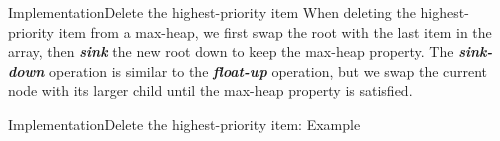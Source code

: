 \documentclass[aspectratio=169]{ctexbeamer}
\newcommand{\highlight}[1]{\textbf{\textit{#1}}}
\begin{document}
    \begin{frame}{Implementation}{Delete the highest-priority item}
        When deleting the highest-priority item from a max-heap, we first swap the root with the last item in the array, then \highlight{sink} the new root down to keep the max-heap property. The \highlight{sink-down} operation is similar to the \highlight{float-up} operation, but we swap the current node with its larger child until the max-heap property is satisfied.
    \end{frame}

    \begin{frame}{Implementation}{Delete the highest-priority item: Example}
        \begin{figure}
        \end{figure}
    \end{frame}
\end{document}
